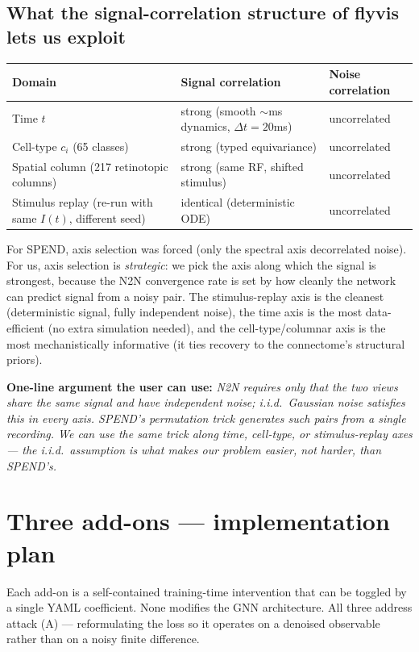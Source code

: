 \documentclass[11pt]{article}
\begin{document}
\subsection{What the signal-correlation structure of flyvis lets us exploit}

\begin{table}[h]
\centering
\small
\begin{tabular}{lll}
\toprule
\textbf{Domain} & \textbf{Signal correlation} & \textbf{Noise correlation} \\
\midrule
Time $t$ & strong (smooth $\sim$ms dynamics, $\Delta t = 20$ms) & uncorrelated \\
Cell-type $c_i$ (65 classes) & strong (typed equivariance) & uncorrelated \\
Spatial column (217 retinotopic columns) & strong (same RF, shifted stimulus) & uncorrelated \\
Stimulus replay (re-run with same $I(t)$, different seed) & identical (deterministic ODE) & uncorrelated \\
\bottomrule
\end{tabular}
\end{table}

For SPEND, axis selection was forced (only the spectral axis decorrelated
noise). For us, axis selection is \emph{strategic}: we pick the axis along
which the signal is strongest, because the N2N convergence rate is set by
how cleanly the network can predict signal from a noisy pair. The
stimulus-replay axis is the cleanest (deterministic signal, fully
independent noise), the time axis is the most data-efficient
(no extra simulation needed), and the cell-type/columnar axis is the most
mechanistically informative (it ties recovery to the connectome's structural
priors).

\textbf{One-line argument the user can use:} \emph{N2N requires only that
the two views share the same signal and have independent noise; i.i.d.\
Gaussian noise satisfies this in every axis. SPEND's permutation trick
generates such pairs from a single recording. We can use the same trick
along time, cell-type, or stimulus-replay axes --- the i.i.d.\ assumption
is what makes our problem easier, not harder, than SPEND's.}

\section{Three add-ons --- implementation plan}

Each add-on is a self-contained training-time intervention that can be
toggled by a single YAML coefficient. None modifies the GNN architecture.
All three address attack (A) --- reformulating the loss so it operates on a
denoised observable rather than on a noisy finite difference.
\end{document}

